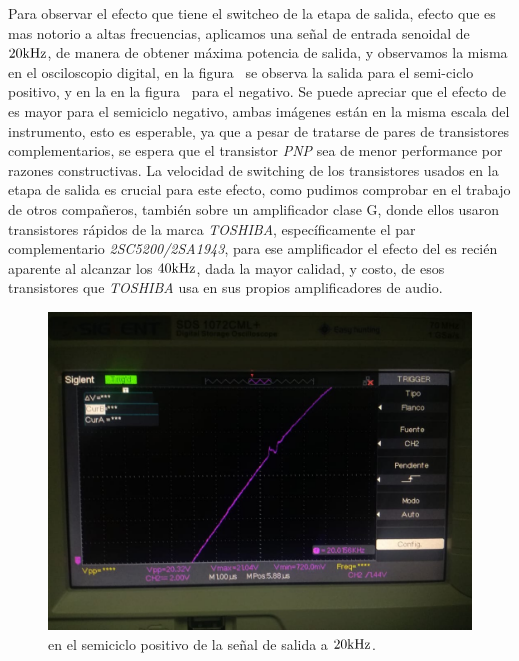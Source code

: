 Para observar el efecto que tiene el switcheo de la etapa de salida, efecto que es mas notorio a altas frecuencias, aplicamos una señal de entrada senoidal de $20 \si[per-mode=symbol]{\kilo\hertz}$, de manera de obtener máxima potencia de salida, y observamos la misma en el osciloscopio digital, en la figura~ se observa la salida para el semi-ciclo positivo, y en la en la figura~ para el negativo. Se puede apreciar que el efecto de \textit{} es mayor para el semiciclo negativo, ambas imágenes están en la misma escala del instrumento, esto es esperable, ya que a pesar de tratarse de pares de transistores complementarios, se espera que el transistor \textit{PNP} sea de menor performance por razones constructivas. La velocidad de switching de los transistores usados en la etapa de salida es crucial para este efecto, como pudimos comprobar en el trabajo de otros compañeros, también sobre un amplificador clase G, donde ellos usaron transistores rápidos de la marca \textit{TOSHIBA}, específicamente el par complementario \textit{2SC5200/2SA1943}, para ese amplificador el efecto del \textit{} es recién aparente al alcanzar los $40 \si[per-mode=symbol]{\kilo\hertz}$, dada la mayor calidad, y costo, de esos transistores que \textit{TOSHIBA} usa en sus propios amplificadores de audio.




\begin{figure}[H]
        \centering
        \includegraphics[width=0.95 \textwidth]{./img/mediciones/Glitch/positivo.jpg}
        \caption{\textit{} en el semiciclo positivo de la señal de salida a $20 \si[per-mode=symbol]{\kilo\hertz}$.}
        \label{fig:glitch_pos}
\end{figure}


